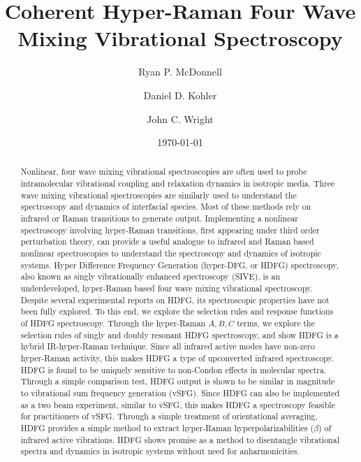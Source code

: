 \documentclass[aip, jcp, reprint, onecolumn]{revtex4-2}
\begin{document}
\title{Coherent Hyper-Raman Four Wave Mixing Vibrational Spectroscopy}


\author{Ryan P. McDonnell} 
\author{Daniel D. Kohler}
\author{John C. Wright} 


\date{\today}

\begin{abstract}
Nonlinear, four wave mixing vibrational spectroscopies are often used to probe intramolecular vibrational coupling and relaxation dynamics in isotropic media.
Three wave mixing vibrational spectroscopies are similarly used to understand the spectroscopy and dynamics of interfacial species.
Most of these methods rely on infrared or Raman transitions to generate output. 
Implementing a nonlinear spectroscopy involving hyper-Raman transitions, first appearing under third order perturbation theory, can provide a useful analogue to infrared and Raman based nonlinear spectroscopies to understand the spectroscopy and dynamics of isotropic systems.
Hyper Difference Frequency Generation (hyper-DFG, or HDFG) spectroscopy, also known as singly vibrationally enhanced spectroscopy (SIVE), is an underdeveloped, hyper-Raman based four wave mixing vibrational spectroscopy. 
Despite several experimental reports on HDFG, its spectroscopic properties have not been fully explored.
To this end, we explore the selection rules and response functions of HDFG spectroscopy.
Through the hyper-Raman $A,B,C$ terms, we explore the selection rules of singly and doubly resonant HDFG spectroscopy, and show HDFG is a hybrid IR-hyper-Raman technique.
Since all infrared active modes have non-zero hyper-Raman activity, this makes HDFG a type of upconverted infrared spectroscopy.
HDFG is found to be uniquely sensitive to non-Condon effects in molecular spectra.
Through a simple comparison test, HDFG output is shown to be similar in magnitude to vibrational sum frequency generation (vSFG).
Since HDFG can also be implemented as a two beam experiment, similar to vSFG, this makes HDFG a spectroscopy feasible for practitioners of vSFG.
Through a simple treatment of orientational averaging, HDFG provides a simple method to extract hyper-Raman hyperpolarizabilities ($\beta$) of infrared active vibrations.
HDFG shows promise as a method to disentangle vibrational spectra and dynamics in isotropic systems without need for anharmonicities.

\end{abstract}
\end{document}

